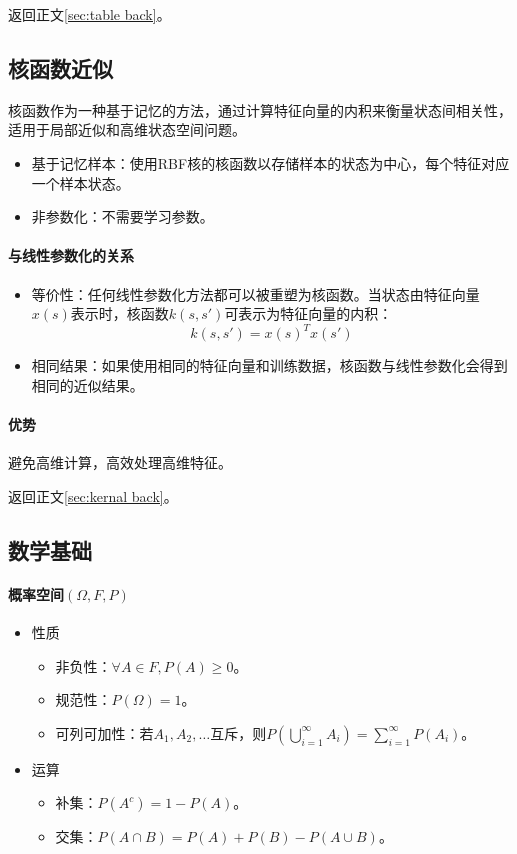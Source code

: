 \documentclass[
12pt, %
a4paper, 
oneside, %
headinclude,footinclude, %
]{scrartcl}
\begin{document}
返回正文\ref{sec:table back}。
\subsection{核函数近似}\label{sec:kernal}
核函数作为一种基于记忆的方法，通过计算特征向量的内积来衡量状态间相关性，适用于局部近似和高维状态空间问题。
\begin{itemize}
\item 基于记忆样本：使用RBF核的核函数以存储样本的状态为中心，每个特征对应一个样本状态。
\item 非参数化：不需要学习参数。
\end{itemize}
\paragraph{与线性参数化的关系}
\begin{itemize}
\item 等价性：任何线性参数化方法都可以被重塑为核函数。当状态由特征向量$ x(s) $表示时，核函数$ k(s, s') $可表示为特征向量的内积：
$$ k(s, s') = x(s)^T x(s') $$
\item 相同结果：如果使用相同的特征向量和训练数据，核函数与线性参数化会得到相同的近似结果。
\end{itemize}
\paragraph{优势}
避免高维计算，高效处理高维特征。

返回正文\ref{sec:kernal back}。
\subsection{数学基础}
\paragraph{概率空间$ (\Omega, F, P) $}
\begin{itemize}
\item 性质
\begin{itemize}
\item 非负性：$ \forall A \in F,P(A) \geq 0 $。
\item 规范性：$ P(\Omega) = 1 $。
\item 可列可加性：若$ A_1, A_2, \dots $互斥，则$ P(\bigcup_{i = 1}^{\infty} A_i) = \sum_{i = 1}^{\infty} P(A_i) $。
\end{itemize}
\item 运算
\begin{itemize}
\item 补集：$ P(A^c) = 1 - P(A) $。
\item 交集：$ P(A \cap B) = P(A) + P(B) - P(A \cup B) $。
\end{itemize}
\end{itemize}
\end{document}
